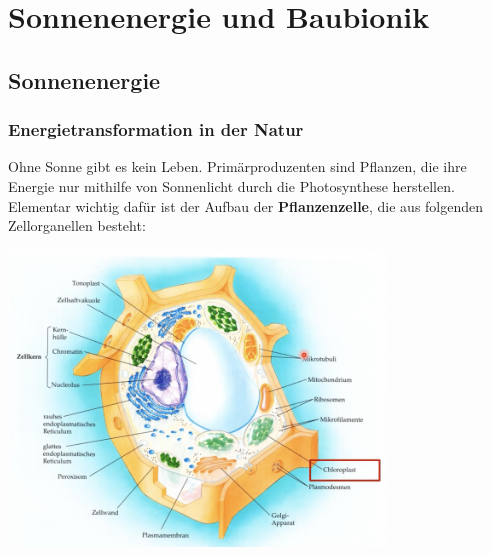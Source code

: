 \section{Sonnenenergie und Baubionik}

\subsection{Sonnenenergie}

\subsubsection{Energietransformation in der Natur}

Ohne Sonne gibt es kein Leben. Primärproduzenten sind Pflanzen, die ihre Energie nur mithilfe von Sonnenlicht durch die Photosynthese herstellen. Elementar wichtig dafür ist der Aufbau der \textbf{Pflanzenzelle}, die aus folgenden Zellorganellen besteht:

\begin{center}
    \includegraphics[width=10cm]{lec7/figures/pflanzenzelle.png}
\end{center}

